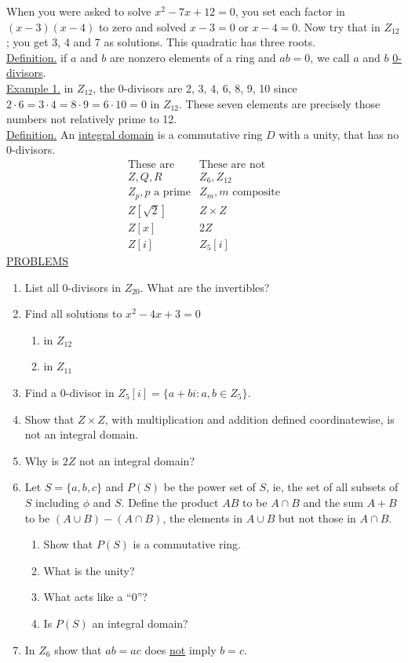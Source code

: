 \documentclass[12pt]{article}
\theoremstyle{definition}
\begin{document}
\quad When you were asked to solve $x^2-7x+12=0$, you set each factor in $(x-3)(x-4)$ to zero and solved $x-3=0$ or $x-4=0$.  Now try that in $Z_{12}$; you get 3, 4 and 7 as solutions.  This quadratic has three roots.\\
\underline{Definition.} if $a$ and $b$ are nonzero elements of a ring and $ab=0$, we call $a$ and $b$ \underline{0-divisors}.\\[.1in]
\underline{Example 1.} in $Z_{12}$, the 0-divisors are 2, 3, 4, 6, 8, 9, 10 since $2\cdot6=3\cdot4=8\cdot9=6\cdot10=0$ in $Z_{12}$.  These seven elements are precisely those numbers not relatively prime to 12.\\[.1in]
%
\underline{Definition.} An \underline{integral domain} is a commutative ring $D$ with a unity, that has no 0-divisors.
$$\begin{array}{c|c}
\text{These are} & \text{These are not}\\
\hline
Z,Q,R & Z_6, Z_{12}\\
Z_p, p \text{ a prime} & Z_m, m\text{ composite}\\
Z[\sqrt2] & Z\times Z\\
Z[x] & 2Z\\
Z[i] &  Z_5[i]
\end{array}$$
\underline{PROBLEMS}
\begin{enumerate}
\item List all 0-divisors in $Z_{20}$.  What are the invertibles?
\item Find all solutions to $x^2-4x+3=0$
\begin{enumerate}
\item in $Z_{12}$
\item in $Z_{11}$
\end{enumerate}
\item Find a 0-divisor in $Z_5[i]=\{a+bi:a,b\in Z_5\}$.
\item Show that $Z\times Z$, with multiplication and addition defined coordinatewise, is not an integral domain.
\item Why is $2Z$ not an integral domain?
\item Let $S=\{a,b,c\}$ and $P(S)$ be the power set of $S$, ie, the set of all subsets of $S$ including $\phi$ and $S$.  Define the product $AB$ to be $A\cap B$ and the sum $A+B$ to be $(A\cup B)-(A\cap B)$, the elements in $A\cup B$ but not those in $A\cap B$.
\begin{enumerate}
\item Show that $P(S)$ is a commutative ring.
\item What is the unity?
\item What acts like a ``0''?
\item Is $P(S)$ an integral domain?
\end{enumerate}
\item In $Z_6$ show that $ab=ac$ does \underline{not} imply $b=c$.
\end{enumerate}
\end{document}

